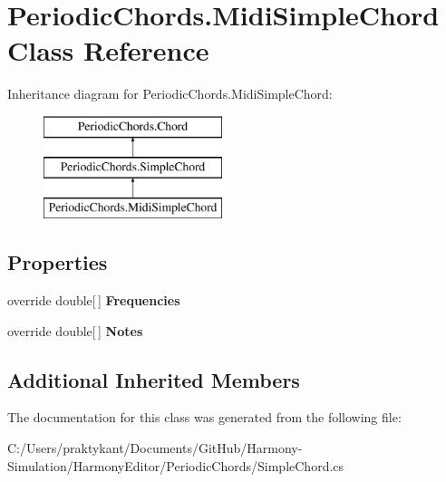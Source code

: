 \hypertarget{class_periodic_chords_1_1_midi_simple_chord}{\section{Periodic\+Chords.\+Midi\+Simple\+Chord Class Reference}
\label{class_periodic_chords_1_1_midi_simple_chord}
}
Inheritance diagram for Periodic\+Chords.\+Midi\+Simple\+Chord\+:\begin{figure}[H]
\begin{center}
\leavevmode
\includegraphics[height=3.000000cm]{class_periodic_chords_1_1_midi_simple_chord}
\end{center}
\end{figure}
\subsection*{Properties}
\begin{DoxyCompactItemize}
\item 
\hypertarget{class_periodic_chords_1_1_midi_simple_chord_ac60a8574539a8d9e909e26ace308e55f}{override double\mbox{[}$\,$\mbox{]} {\bfseries Frequencies}}\label{class_periodic_chords_1_1_midi_simple_chord_ac60a8574539a8d9e909e26ace308e55f}

\item 
\hypertarget{class_periodic_chords_1_1_midi_simple_chord_a7f0bdddefff85af2f94de594ecacd9f8}{override double\mbox{[}$\,$\mbox{]} {\bfseries Notes}}\label{class_periodic_chords_1_1_midi_simple_chord_a7f0bdddefff85af2f94de594ecacd9f8}

\end{DoxyCompactItemize}
\subsection*{Additional Inherited Members}


The documentation for this class was generated from the following file\+:\begin{DoxyCompactItemize}
\item 
C\+:/\+Users/praktykant/\+Documents/\+Git\+Hub/\+Harmony-\/\+Simulation/\+Harmony\+Editor/\+Periodic\+Chords/Simple\+Chord.\+cs\end{DoxyCompactItemize}
